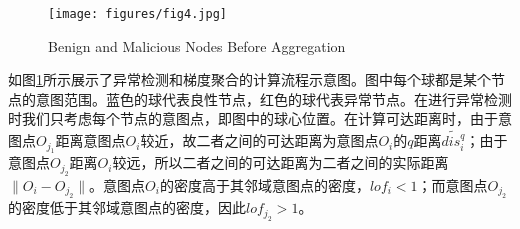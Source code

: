 \documentclass[lettersize,journal]{IEEEtran}
\begin{document}
\begin{enumerate}










\end{enumerate}

\begin{figure}[!t]
    \centering
    \texttt{[image: figures/fig4.jpg]}
    \caption{Benign and Malicious Nodes Before Aggregation}
    \label{fig:before-agg}
\end{figure}

如图\ref{fig:before-agg}所示展示了异常检测和梯度聚合的计算流程示意图。图中每个球都是某个节点的意图范围。蓝色的球代表良性节点，红色的球代表异常节点。在进行异常检测时我们只考虑每个节点的意图点，即图中的球心位置。在计算可达距离时，由于意图点$O_{j_1}$距离意图点$O_i$较近，故二者之间的可达距离为意图点$O_i$的$q$距离$\widetilde{dis_i^q}$；由于意图点$O_{j_2}$距离$O_i$较远，所以二者之间的可达距离为二者之间的实际距离$\|O_i-O_{j_2}\|$。意图点$O_i$的密度高于其邻域意图点的密度，$lof_i<1$；而意图点$O_{j_2}$的密度低于其邻域意图点的密度，因此$lof_{j_2} > 1$。
\end{document}
